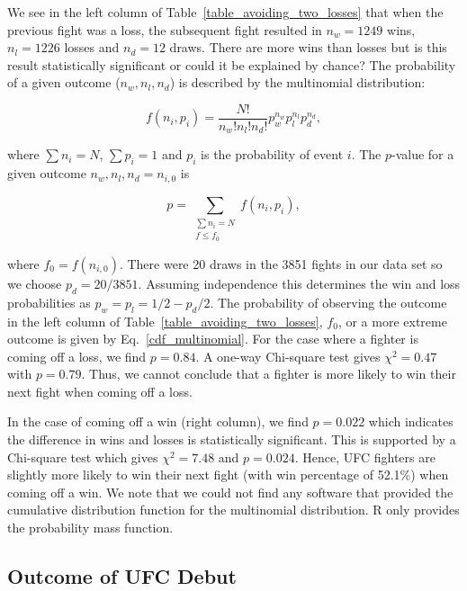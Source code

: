 We see in the left column of Table~\ref{table_avoiding_two_losses} that
when the previous fight was a loss, the subsequent fight resulted
in $n_w=1249$ wins, $n_l=1226$ losses and $n_d=12$ draws. There are more wins than losses but
is this result statistically significant or could it be explained
by chance? The probability of a given outcome ($n_w, n_l, n_d$) is described by
the multinomial distribution:

\begin{equation}
f(n_i, p_i) = \frac{N!}{n_w! n_l! n_d!}p_w^{n_w}p_l^{n_l}p_d^{n_d},
\end{equation}

\noindent
where $\sum n_i = N$, $\sum p_i=1$ and $p_i$ is the probability
of event $i$. The $p$-value for a given
outcome $n_w, n_l, n_d=n_{i,0}$ is

\begin{equation}
p = \sum_{\substack{{\sum n_i = N} \\ {f \le f_0}}}f(n_i, p_i),
\label{cdf_multinomial}
\end{equation}

\noindent
where $f_0=f(n_{i,0})$.
There were 20 draws in the 3851 fights in our data set so we
choose $p_d=20/3851$. Assuming independence this determines the win and loss probabilities as
$p_w=p_l=1/2 - p_d/2$.
The probability of observing the outcome in the left
column of Table~\ref{table_avoiding_two_losses}, $f_0$, or a more extreme outcome
is given by Eq.~\ref{cdf_multinomial}. For the case where a fighter
is coming off a loss, we find $p=0.84$. A one-way Chi-square test gives $\chi^2=0.47$ with $p=0.79$.
Thus, we cannot conclude that a fighter is more likely to win their next fight
when coming off a loss.

In the case
of coming off a win (right column), we find $p=0.022$ which
indicates the difference in wins and losses is statistically significant. This is supported by a Chi-square test which
gives $\chi^2=7.48$ and $p=0.024$. Hence, 
UFC fighters are slightly more likely to win their next
fight (with win percentage of 52.1\%) when coming off a win.
We note that we could not find any software that provided the cumulative
distribution function for the multinomial distribution. R only provides
the probability mass function.

\subsection*{Outcome of UFC Debut}

